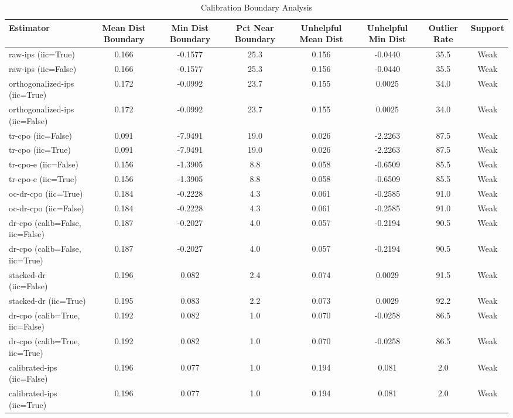 \begin{table}[htbp]
\centering
\caption{Calibration Boundary Analysis}
\label{tab:A5}
\begin{tabular}{l|ccccccc}
\toprule
Estimator & Mean Dist Boundary & Min Dist Boundary & Pct Near Boundary & Unhelpful Mean Dist & Unhelpful Min Dist & Outlier Rate & Support \\
\midrule
raw-ips (iic=True) & 0.166 & -0.1577 & 25.3 & 0.156 & -0.0440 & 35.5 & Weak \\
raw-ips (iic=False) & 0.166 & -0.1577 & 25.3 & 0.156 & -0.0440 & 35.5 & Weak \\
orthogonalized-ips (iic=True) & 0.172 & -0.0992 & 23.7 & 0.155 & 0.0025 & 34.0 & Weak \\
orthogonalized-ips (iic=False) & 0.172 & -0.0992 & 23.7 & 0.155 & 0.0025 & 34.0 & Weak \\
tr-cpo (iic=False) & 0.091 & -7.9491 & 19.0 & 0.026 & -2.2263 & 87.5 & Weak \\
tr-cpo (iic=True) & 0.091 & -7.9491 & 19.0 & 0.026 & -2.2263 & 87.5 & Weak \\
tr-cpo-e (iic=False) & 0.156 & -1.3905 & 8.8 & 0.058 & -0.6509 & 85.5 & Weak \\
tr-cpo-e (iic=True) & 0.156 & -1.3905 & 8.8 & 0.058 & -0.6509 & 85.5 & Weak \\
oc-dr-cpo (iic=True) & 0.184 & -0.2228 & 4.3 & 0.061 & -0.2585 & 91.0 & Weak \\
oc-dr-cpo (iic=False) & 0.184 & -0.2228 & 4.3 & 0.061 & -0.2585 & 91.0 & Weak \\
dr-cpo (calib=False, iic=False) & 0.187 & -0.2027 & 4.0 & 0.057 & -0.2194 & 90.5 & Weak \\
dr-cpo (calib=False, iic=True) & 0.187 & -0.2027 & 4.0 & 0.057 & -0.2194 & 90.5 & Weak \\
stacked-dr (iic=False) & 0.196 & 0.082 & 2.4 & 0.074 & 0.0029 & 91.5 & Weak \\
stacked-dr (iic=True) & 0.195 & 0.083 & 2.2 & 0.073 & 0.0029 & 92.2 & Weak \\
dr-cpo (calib=True, iic=False) & 0.192 & 0.082 & 1.0 & 0.070 & -0.0258 & 86.5 & Weak \\
dr-cpo (calib=True, iic=True) & 0.192 & 0.082 & 1.0 & 0.070 & -0.0258 & 86.5 & Weak \\
calibrated-ips (iic=False) & 0.196 & 0.077 & 1.0 & 0.194 & 0.081 & 2.0 & Weak \\
calibrated-ips (iic=True) & 0.196 & 0.077 & 1.0 & 0.194 & 0.081 & 2.0 & Weak \\
\bottomrule
\end{tabular}
\end{table}
